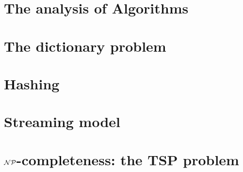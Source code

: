 \documentclass[dawn, draft]{lectures2}
\begin{document}
    \maketitle

    \section{The analysis of Algorithms}
    

    \section{The dictionary problem}
    

    \section{Hashing}
    

    \section{Streaming model}
    

    \section{$\operatorname{\mathcal{NP}}$-completeness: the TSP problem}
    

    \printbibliography
\end{document}
